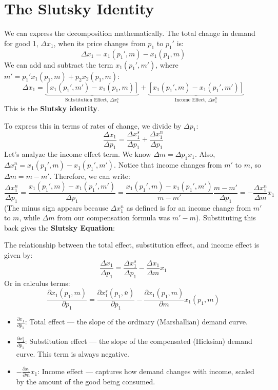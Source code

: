 \section{The Slutsky Identity}
We can express the decomposition mathematically. The total change in demand for good 1, \(\Delta x_1\), when its price changes from \(p_1\) to \(p_1'\) is:
\[
\Delta x_1 = x_1(p_1', m) - x_1(p_1, m)
\]
We can add and subtract the term \(x_1(p_1', m')\), where \(m' = p_1' x_1(p_1, m) + p_2 x_2(p_1, m)\):
\[
\Delta x_1 = \underbrace{[x_1(p_1', m') - x_1(p_1, m)]}_{\text{Substitution Effect, } \Delta x_1^s} + \underbrace{[x_1(p_1', m) - x_1(p_1', m')]}_{\text{Income Effect, } \Delta x_1^n}
\]
This is the \textbf{Slutsky identity}.

To express this in terms of rates of change, we divide by \(\Delta p_1\):
\[
\frac{\Delta x_1}{\Delta p_1} = \frac{\Delta x_1^s}{\Delta p_1} + \frac{\Delta x_1^n}{\Delta p_1}
\]
Let's analyze the income effect term. We know \(\Delta m = \Delta p_1 x_1\). Also, \(\Delta x_1^n = x_1(p_1', m) - x_1(p_1', m')\). Notice that income changes from \(m'\) to \(m\), so \(\Delta m = m - m'\).
Therefore, we can write:
\[
\frac{\Delta x_1^n}{\Delta p_1} = \frac{x_1(p_1', m) - x_1(p_1', m')}{\Delta p_1} = \frac{x_1(p_1', m) - x_1(p_1', m')}{m - m'} \frac{m - m'}{\Delta p_1} = -\frac{\Delta x_1^n}{\Delta m} x_1
\]
(The minus sign appears because \(\Delta x_1^n\) as defined is for an income change from \(m'\) to \(m\), while \(\Delta m\) from our compensation formula was \(m' - m\)).
Substituting this back gives the \textbf{Slutsky Equation}:

\begin{tcolorbox}[colback=blue!5!white, colframe=blue!75!black, fonttitle=\bfseries, title=The Slutsky Equation]
The relationship between the total effect, substitution effect, and income effect is given by:
\[
\frac{\Delta x_1}{\Delta p_1} = \frac{\Delta x_1^s}{\Delta p_1} - \frac{\Delta x_1}{\Delta m} x_1
\]
Or in calculus terms:
\[
\frac{\partial x_1(p_1, m)}{\partial p_1} = \frac{\partial x_1^s(p_1, \bar{u})}{\partial p_1} - \frac{\partial x_1(p_1, m)}{\partial m} x_1(p_1, m)
\]
\end{tcolorbox}

\begin{itemize}
    \item \(\frac{\partial x_1}{\partial p_1}\): Total effect --- the slope of the ordinary (Marshallian) demand curve.
    \item \(\frac{\partial x_1^s}{\partial p_1}\): Substitution effect --- the slope of the compensated (Hicksian) demand curve. This term is always negative.
    \item \(-\frac{\partial x_1}{\partial m} x_1\): Income effect --- captures how demand changes with income, scaled by the amount of the good being consumed.
\end{itemize}


